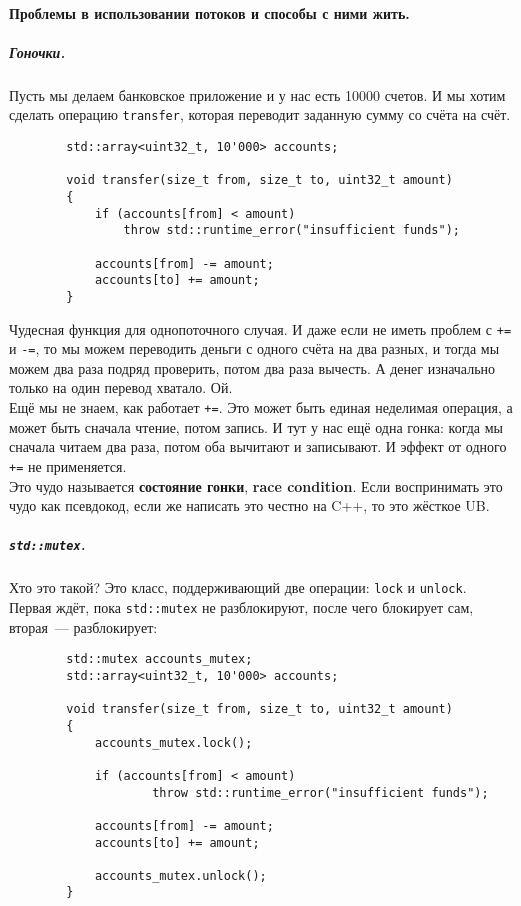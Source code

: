 \documentclass{article}
\begin{document}
    \paragraph{Проблемы в использовании потоков и способы с ними жить.}
    \subparagraph{Гоночки.}
    Пусть мы делаем банковское приложение и у нас есть 10000 счетов. И мы хотим сделать операцию \texttt{transfer}, которая переводит заданную сумму со счёта на счёт.
    \begin{verbatim}
        std::array<uint32_t, 10'000> accounts;

        void transfer(size_t from, size_t to, uint32_t amount)
        {
            if (accounts[from] < amount)
                throw std::runtime_error("insufficient funds");

            accounts[from] -= amount;
            accounts[to] += amount;
        }
    \end{verbatim}
    Чудесная функция для однопоточного случая. И даже если не иметь проблем с \texttt{+=} и \texttt{-=}, то мы можем переводить деньги с одного счёта на два разных, и тогда мы можем два раза подряд проверить, потом два раза вычесть. А денег изначально только на один перевод хватало. Ой.\\
    Ещё мы не знаем, как работает \texttt{+=}. Это может быть единая неделимая операция, а может быть сначала чтение, потом запись. И тут у нас ещё одна гонка: когда мы сначала читаем два раза, потом оба вычитают и записывают. И эффект от одного \texttt{+=} не применяется.\\
    Это чудо называется \textbf{состояние гонки}, \textbf{race condition}. Если воспринимать это чудо как псевдокод, если же написать это честно на C++, то это жёсткое UB.
    \subparagraph{\texttt{std::mutex}.}
    Хто это такой? Это класс, поддерживающий две операции: \texttt{lock} и \texttt{unlock}. Первая ждёт, пока \texttt{std::mutex} не разблокируют, после чего блокирует сам, вторая~--- разблокирует:
    \begin{verbatim}
        std::mutex accounts_mutex;
        std::array<uint32_t, 10'000> accounts;
        
        void transfer(size_t from, size_t to, uint32_t amount)
        {
            accounts_mutex.lock();

            if (accounts[from] < amount)
                    throw std::runtime_error("insufficient funds");
            
            accounts[from] -= amount;
            accounts[to] += amount;

            accounts_mutex.unlock();
        }
    \end{verbatim}
\end{document}
